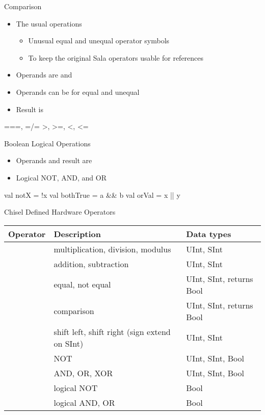 \begin{frame}[fragile]{Comparison}
\begin{itemize}
\item The usual operations
\begin{itemize}
\item Unusual equal and unequal operator symbols
\item To keep the original Sala operators usable for references
\end{itemize}
\item Operands are  and 
\item Operands can be  for equal and unequal
\item Result is 
\end{itemize}
\begin{chisel}
===, =/=
>, >=, <, <=
\end{chisel}
\end{frame}

\begin{frame}[fragile]{Boolean Logical Operations}
\begin{itemize}
\item Operands and result are 
\item Logical NOT, AND, and OR
\end{itemize}
\begin{chisel}
val notX = !x
val bothTrue = a && b
val orVal = x || y
\end{chisel}
\end{frame}

\begin{frame}[fragile]{Chisel Defined Hardware Operators}
\begin{table}
{\footnotesize
  \begin{tabular}{lll}
    \toprule
    Operator & Description & Data types \\
    \midrule
    \code{* / \%} & multiplication, division, modulus & UInt, SInt \\
    \code{+ -} & addition, subtraction & UInt, SInt \\
    \code{=== =/=} & equal, not equal & UInt, SInt, returns Bool \\
    \code{> >= < <=} & comparison & UInt, SInt, returns Bool \\
    \code{<< >>} & shift left, shift right (sign extend on SInt) & UInt, SInt \\
    \code{\~} & NOT & UInt, SInt, Bool \\
    \code{\& | \^} & AND, OR, XOR & UInt, SInt, Bool \\
    \code{!} & logical NOT & Bool \\
    \code{\&\& ||} & logical AND, OR & Bool \\
    \bottomrule 
  \end{tabular} 
  }
\end{table}
\end{frame}

